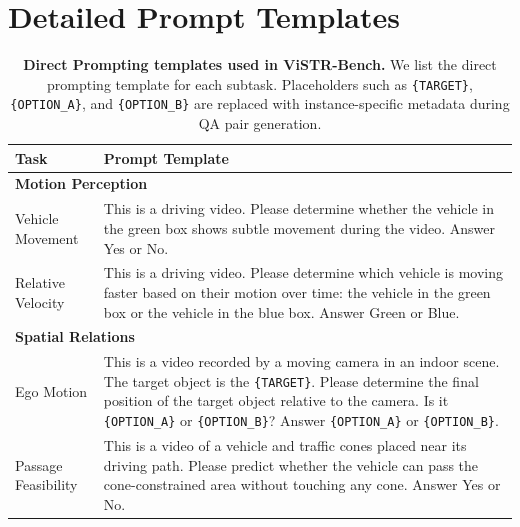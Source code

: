 \section{Detailed Prompt Templates}
\label{sec:detailed_prompt_templates}

\begin{table}[!t]
    \centering
    \caption{
        \textbf{Direct Prompting templates used in ViSTR-Bench.}
        We list the direct prompting template for each subtask.
        Placeholders such as \texttt{\{TARGET\}}, \texttt{\{OPTION\_A\}}, and \texttt{\{OPTION\_B\}} are replaced with instance-specific metadata during QA pair generation.
    }
    \label{tab:direct_prompt_templates}
    \small
    \begin{tabular}{p{} p{}}
        \toprule
        \textbf{Task} & \textbf{Prompt Template} \\
        \midrule

        \multicolumn{2}{l}{\textbf{Motion Perception}} \\
        \quad Vehicle Movement
        & This is a driving video. Please determine whether the vehicle in the green box shows subtle movement during the video. Answer Yes or No. \\

        \quad Relative Velocity
        & This is a driving video. Please determine which vehicle is moving faster based on their motion over time: the vehicle in the green box or the vehicle in the blue box. Answer Green or Blue. \\
        \midrule

        \multicolumn{2}{l}{\textbf{Spatial Relations}} \\
        \quad Ego Motion
        & This is a video recorded by a moving camera in an indoor scene. The target object is the \texttt{\{TARGET\}}. Please determine the final position of the target object relative to the camera. Is it \texttt{\{OPTION\_A\}} or \texttt{\{OPTION\_B\}}? Answer \texttt{\{OPTION\_A\}} or \texttt{\{OPTION\_B\}}. \\

        \quad Passage Feasibility
        & This is a video of a vehicle and traffic cones placed near its driving path. Please predict whether the vehicle can pass the cone-constrained area without touching any cone. Answer Yes or No. \\
        \midrule


\end{tabular}
\end{table}
